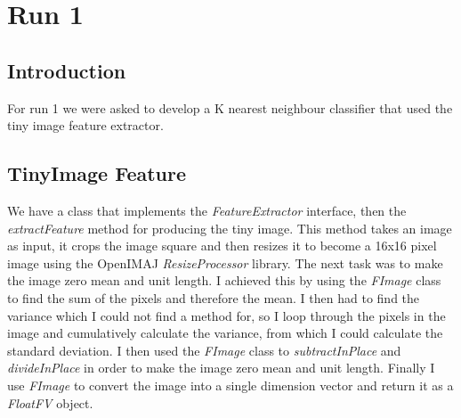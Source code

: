 \documentclass{article}
\begin{document}
	
	\section{Run 1}
	
	\subsection{Introduction}
	For run 1 we were asked to develop a K nearest neighbour classifier that used the tiny image feature extractor.
	\subsection{TinyImage Feature}
	We have a class that implements the \textit{FeatureExtractor} interface, then the \textit{extractFeature} method for producing the tiny image.
	This method takes an image as input, it crops the image square and then resizes it to become a 16x16 pixel image using the OpenIMAJ \textit{ResizeProcessor} library.
	The next task was to make the image zero mean and unit length. I achieved this by using the \textit{FImage} class to find the sum of the pixels and therefore the mean. I then had to find the variance which I could not find a method for, so I loop through the pixels in the image and cumulatively calculate the variance, from which I could calculate the standard deviation.
	I then used the \textit{FImage} class to \textit{subtractInPlace} and \textit{divideInPlace} in order to make the image zero mean and unit length. Finally I use \textit{FImage} to convert the image into a single dimension vector and return it as a \textit{FloatFV} object.
\end{document}
